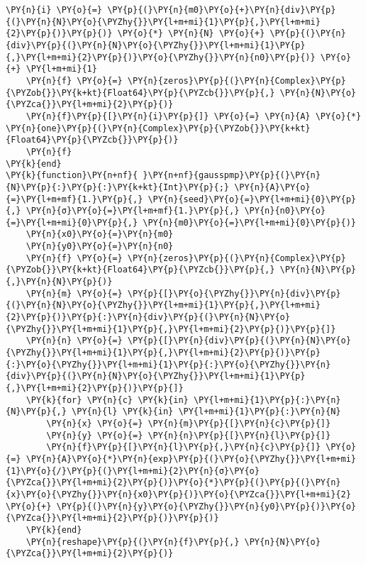 \begin{Verbatim}[commandchars=\\\{\}]
    \PY{n}{i} \PY{o}{=} \PY{p}{(}\PY{n}{m0}\PY{o}{+}\PY{n}{div}\PY{p}{(}\PY{n}{N}\PY{o}{\PYZhy{}}\PY{l+m+mi}{1}\PY{p}{,}\PY{l+m+mi}{2}\PY{p}{)}\PY{p}{)} \PY{o}{*} \PY{n}{N} \PY{o}{+} \PY{p}{(}\PY{n}{div}\PY{p}{(}\PY{n}{N}\PY{o}{\PYZhy{}}\PY{l+m+mi}{1}\PY{p}{,}\PY{l+m+mi}{2}\PY{p}{)}\PY{o}{\PYZhy{}}\PY{n}{n0}\PY{p}{)} \PY{o}{+} \PY{l+m+mi}{1}
    \PY{n}{f} \PY{o}{=} \PY{n}{zeros}\PY{p}{(}\PY{n}{Complex}\PY{p}{\PYZob{}}\PY{k+kt}{Float64}\PY{p}{\PYZcb{}}\PY{p}{,} \PY{n}{N}\PY{o}{\PYZca{}}\PY{l+m+mi}{2}\PY{p}{)}
    \PY{n}{f}\PY{p}{[}\PY{n}{i}\PY{p}{]} \PY{o}{=} \PY{n}{A} \PY{o}{*} \PY{n}{one}\PY{p}{(}\PY{n}{Complex}\PY{p}{\PYZob{}}\PY{k+kt}{Float64}\PY{p}{\PYZcb{}}\PY{p}{)}
    \PY{n}{f}
\PY{k}{end}
\PY{k}{function}\PY{n+nf}{ }\PY{n+nf}{gausspmp}\PY{p}{(}\PY{n}{N}\PY{p}{:}\PY{p}{:}\PY{k+kt}{Int}\PY{p}{;} \PY{n}{A}\PY{o}{=}\PY{l+m+mf}{1.}\PY{p}{,} \PY{n}{seed}\PY{o}{=}\PY{l+m+mi}{0}\PY{p}{,} \PY{n}{σ}\PY{o}{=}\PY{l+m+mf}{1.}\PY{p}{,} \PY{n}{n0}\PY{o}{=}\PY{l+m+mi}{0}\PY{p}{,} \PY{n}{m0}\PY{o}{=}\PY{l+m+mi}{0}\PY{p}{)}
    \PY{n}{x0}\PY{o}{=}\PY{n}{m0}
    \PY{n}{y0}\PY{o}{=}\PY{n}{n0}
    \PY{n}{f} \PY{o}{=} \PY{n}{zeros}\PY{p}{(}\PY{n}{Complex}\PY{p}{\PYZob{}}\PY{k+kt}{Float64}\PY{p}{\PYZcb{}}\PY{p}{,} \PY{n}{N}\PY{p}{,}\PY{n}{N}\PY{p}{)}
    \PY{n}{m} \PY{o}{=} \PY{p}{[}\PY{o}{\PYZhy{}}\PY{n}{div}\PY{p}{(}\PY{n}{N}\PY{o}{\PYZhy{}}\PY{l+m+mi}{1}\PY{p}{,}\PY{l+m+mi}{2}\PY{p}{)}\PY{p}{:}\PY{n}{div}\PY{p}{(}\PY{n}{N}\PY{o}{\PYZhy{}}\PY{l+m+mi}{1}\PY{p}{,}\PY{l+m+mi}{2}\PY{p}{)}\PY{p}{]}
    \PY{n}{n} \PY{o}{=} \PY{p}{[}\PY{n}{div}\PY{p}{(}\PY{n}{N}\PY{o}{\PYZhy{}}\PY{l+m+mi}{1}\PY{p}{,}\PY{l+m+mi}{2}\PY{p}{)}\PY{p}{:}\PY{o}{\PYZhy{}}\PY{l+m+mi}{1}\PY{p}{:}\PY{o}{\PYZhy{}}\PY{n}{div}\PY{p}{(}\PY{n}{N}\PY{o}{\PYZhy{}}\PY{l+m+mi}{1}\PY{p}{,}\PY{l+m+mi}{2}\PY{p}{)}\PY{p}{]}
    \PY{k}{for} \PY{n}{c} \PY{k}{in} \PY{l+m+mi}{1}\PY{p}{:}\PY{n}{N}\PY{p}{,} \PY{n}{l} \PY{k}{in} \PY{l+m+mi}{1}\PY{p}{:}\PY{n}{N}
        \PY{n}{x} \PY{o}{=} \PY{n}{m}\PY{p}{[}\PY{n}{c}\PY{p}{]}
        \PY{n}{y} \PY{o}{=} \PY{n}{n}\PY{p}{[}\PY{n}{l}\PY{p}{]}
        \PY{n}{f}\PY{p}{[}\PY{n}{l}\PY{p}{,}\PY{n}{c}\PY{p}{]} \PY{o}{=} \PY{n}{A}\PY{o}{*}\PY{n}{exp}\PY{p}{(}\PY{o}{\PYZhy{}}\PY{l+m+mi}{1}\PY{o}{/}\PY{p}{(}\PY{l+m+mi}{2}\PY{n}{σ}\PY{o}{\PYZca{}}\PY{l+m+mi}{2}\PY{p}{)}\PY{o}{*}\PY{p}{(}\PY{p}{(}\PY{n}{x}\PY{o}{\PYZhy{}}\PY{n}{x0}\PY{p}{)}\PY{o}{\PYZca{}}\PY{l+m+mi}{2} \PY{o}{+} \PY{p}{(}\PY{n}{y}\PY{o}{\PYZhy{}}\PY{n}{y0}\PY{p}{)}\PY{o}{\PYZca{}}\PY{l+m+mi}{2}\PY{p}{)}\PY{p}{)}
    \PY{k}{end}
    \PY{n}{reshape}\PY{p}{(}\PY{n}{f}\PY{p}{,} \PY{n}{N}\PY{o}{\PYZca{}}\PY{l+m+mi}{2}\PY{p}{)}

\end{Verbatim}
